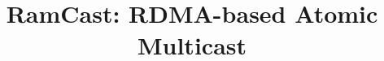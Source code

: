 \documentclass[10pt, conference, compsocconf]{IEEEtran}
\begin{document}
\title{RamCast: RDMA-based Atomic Multicast}
\date{}
\maketitle










\clearpage




\end{document}
